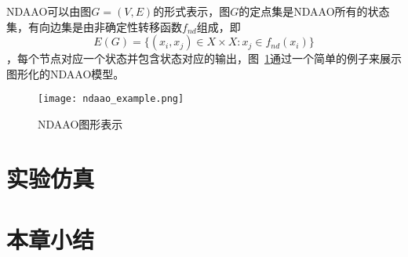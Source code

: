 NDAAO可以由图$G=(V,E)$的形式表示，图$G$的定点集是NDAAO所有的状态集，有向边集是由非确定性转移函数$f_{nd}$组成，即\[ E(G)=\big\{(x_i,x_j)\in X\times X: x_j\in f_{nd}(x_i)\big\} \]，每个节点对应一个状态并包含状态对应的输出，图~\ref{fig4}通过一个简单的例子来展示图形化的NDAAO模型。

\begin{figure}[!htb]
  \centering
  \texttt{[image: ndaao\_example.png]}
  \caption{NDAAO图形表示}
  \label{fig4}
\end{figure}

\section{实验仿真}
\label{sec:simulation}

\section{本章小结}
\label{sec:insertimage}

